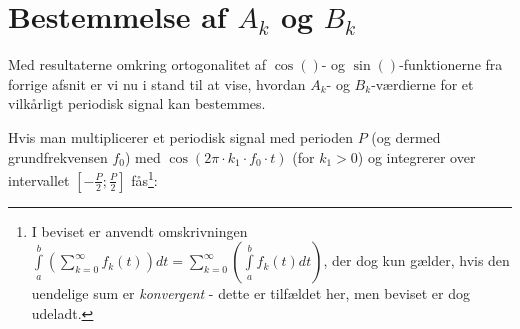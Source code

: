 \documentclass[11pt,a4paper]{article}
\begin{document}
\section{Bestemmelse af $A_k$ og $B_k$}
Med resultaterne omkring ortogonalitet af $\cos()$- og $\sin()$-funktionerne fra forrige afsnit er vi nu i stand til at vise, hvordan $A_k$- og $B_k$-værdierne for et vilkårligt periodisk signal kan bestemmes.

Hvis man multiplicerer et periodisk signal med perioden $P$ (og dermed grundfrekvensen $f_0$) med $\cos(2\pi\cdot{}k_{1}\cdot{}f_{0}\cdot{}t)$ (for $k_1>0$) og integrerer over intervallet $\left[ -\frac{P}{2} ; \frac{P}{2} \right]$ fås\footnote{I beviset er anvendt omskrivningen $\int\limits_{a}^b\left(\sum\limits_{k=0}^{\infty}f_{k}(t)\right)dt=\sum\limits_{k=0}^{\infty}\left(\int\limits_{a}^{b}f_{k}(t)dt\right)$, der dog kun gælder, hvis den uendelige sum er \emph{konvergent} - dette er tilfældet her, men beviset er dog udeladt.}:
\end{document}
